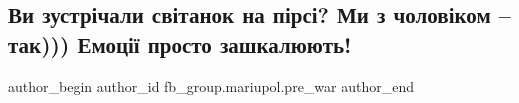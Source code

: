  
 
 
 
 

\subsection{Ви зустрічали світанок на пірсі? Ми з чоловіком – так))) Емоції просто зашкалюють!}
\label{sec:12_02_2023.fb.fb_group.mariupol.pre_war.10.vi_zustr_chali_sv_ta}

\ifcmt
 author_begin
   author_id fb_group.mariupol.pre_war
 author_end
\fi
